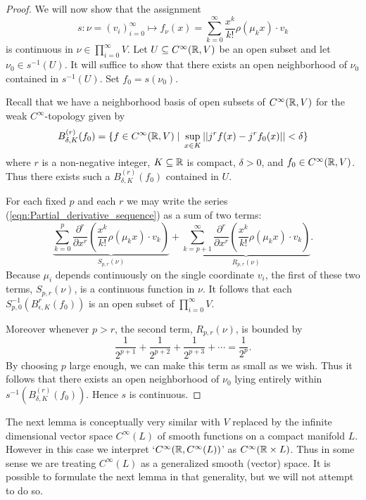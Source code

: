 \documentclass{article}
\newtheorem{proposed work}[theorem]{Proposed Work}
\begin{document}
\begin{proof}
We will now show that the assignment
\begin{equation*}
	s: \nu = (v_i)_{i=0}^\infty \mapsto f_\nu(x) = \sum_{k=0}^\infty \frac{x^k}{k!} \rho(\mu_k x) \cdot v_k
\end{equation*}
  is continuous in $\nu \in \prod_{i=0}^\infty V $. Let $U \subseteq C^\infty(\mathbb R, V)$ be an open subset and let $\nu_0 \in s^{-1}(U)$. It will suffice to show that there exists an open neighborhood of $\nu_0$ contained in $s^{-1}(U)$. Set $f_0 = s(\nu_0)$.

Recall that we have a neighborhood basis of open subsets of $C^\infty(\mathbb R, V)$ for the weak $C^\infty$-topology given by
\begin{equation*}
	B^{(r)}_{\delta,K}(f_0) = \{ f \in C^\infty(\mathbb R, V) \; | \; \sup_{x \in K}|| j^rf(x) - j^rf_0(x) || < \delta \}
\end{equation*} 
where $r$ is a non-negative integer, $K \subseteq \mathbb R$ is compact, $\delta > 0$, and $f_0 \in C^\infty(\mathbb R, V)$. Thus there exists such a $B^{(r)}_{\delta, K}(f_0)$ contained in $U$. 

For each fixed $p$ and each $r$ we may write the series (\ref{eqn:Partial_derivative_sequence}) as a sum of two terms:
\begin{equation*}
		\underbrace{\sum_{k=0}^p \frac{\partial^r}{\partial x^r} \left( \frac{x^k}{k!} \rho(\mu_k x) \cdot v_k \right)}_{S_{p,r}(\nu)}
		+ 	\underbrace{\sum_{k=p+1}^\infty \frac{\partial^r}{\partial x^r} \left( \frac{x^k}{k!} \rho(\mu_k x) \cdot v_k \right)}_{R_{p,r}(\nu)}.
\end{equation*}
Because $\mu_i$ depends continuously on the single coordinate $v_i$, the first of these two terms, $S_{p,r}(\nu)$, is a continuous function in $\nu$. It follows that each $S_{p,0}^{-1}(B^r_{\epsilon, K}(f_0))$ is an open subset of $ \prod_{i=0}^\infty V $. 

Moreover whenever $p>r$, the second term, $R_{p,r}(\nu)$, is bounded by
\begin{equation*}
	\frac{1}{2^{p+1}}+ \frac{1}{2^{p+2}}+ \frac{1}{2^{p+3}}+ \cdots = \frac{1}{2^p}.
\end{equation*} 
By choosing $p$ large enough, we can make this term as small as we wish. Thus it follows that there exists an open neighborhood of $\nu_0$ lying entirely within $s^{-1}(B^{(r)}_{\delta, K}(f_0))$. Hence $s$ is continuous.
\end{proof}

The next lemma is conceptually very similar with $V$ replaced by the infinite dimensional vector space $C^\infty(L)$ of smooth functions on a compact manifold $L$. However in this case we interpret `$C^\infty(\mathbb R, C^\infty(L))$' as $C^\infty(\mathbb R \times L)$. Thus in some sense we are treating $C^\infty(L)$ as a generalized smooth (vector) space. It is possible to formulate the next lemma in that generality, but we will not attempt to do so.  
\end{document}
